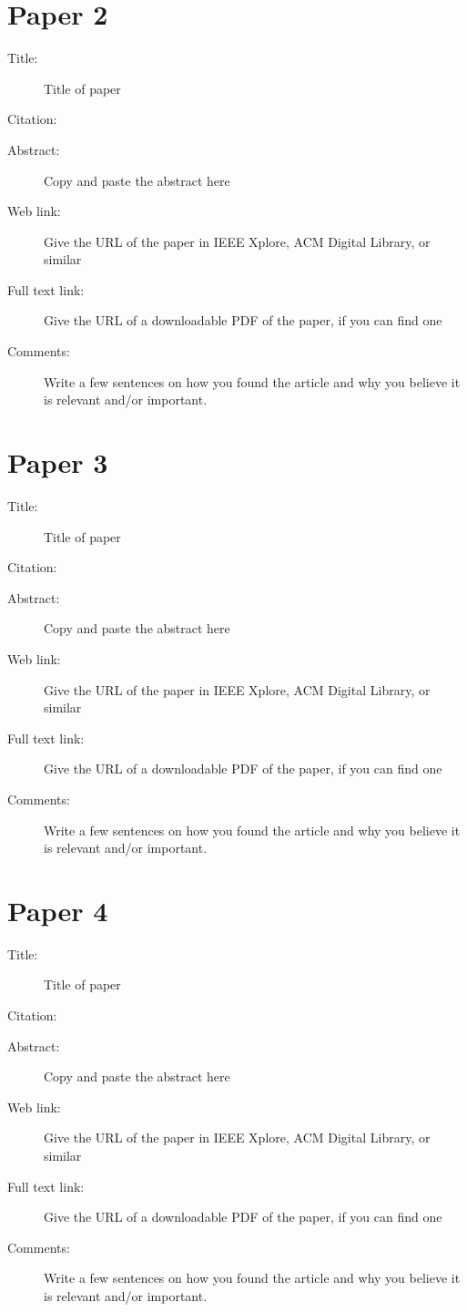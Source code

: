 \documentclass{scrartcl}
\begin{document}
\section*{Paper 2}
\begin{description}
\item[Title:] Title of paper
\item[Citation:] \cite{bibtex_key}
\item[Abstract:] Copy and paste the abstract here
\item[Web link:] Give the URL of the paper in IEEE Xplore, ACM Digital Library, or similar
\item[Full text link:] Give the URL of a downloadable PDF of the paper, if you can find one
\item[Comments:] Write a few sentences on how you found the article and why you believe it is relevant and/or important.
\end{description}

\section*{Paper 3}
\begin{description}
\item[Title:] Title of paper
\item[Citation:] \cite{bibtex_key}
\item[Abstract:] Copy and paste the abstract here
\item[Web link:] Give the URL of the paper in IEEE Xplore, ACM Digital Library, or similar
\item[Full text link:] Give the URL of a downloadable PDF of the paper, if you can find one
\item[Comments:] Write a few sentences on how you found the article and why you believe it is relevant and/or important.
\end{description}

\section*{Paper 4}
\begin{description}
\item[Title:] Title of paper
\item[Citation:] \cite{bibtex_key}
\item[Abstract:] Copy and paste the abstract here
\item[Web link:] Give the URL of the paper in IEEE Xplore, ACM Digital Library, or similar
\item[Full text link:] Give the URL of a downloadable PDF of the paper, if you can find one
\item[Comments:] Write a few sentences on how you found the article and why you believe it is relevant and/or important.
\end{description}
\end{document}
